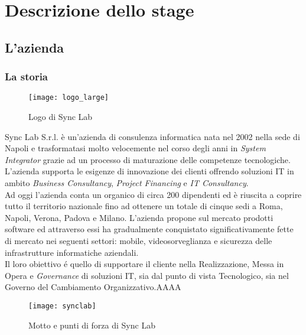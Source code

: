 
\chapter{Descrizione dello stage}
\label{cap:descrizione-stage}



\section{L'azienda}

\subsection{La storia}

\begin{figure}[H]
	\begin{center}
		\texttt{[image: logo\_large]}
		\caption{Logo di Sync Lab}
	\end{center}
\end{figure}

Sync Lab S.r.l. è un'azienda di consulenza informatica nata nel 2002 nella sede di Napoli e trasformatasi molto velocemente nel corso degli anni in \textit{System Integrator} grazie ad un processo di maturazione delle competenze tecnologiche.\\ L'azienda supporta le esigenze di innovazione dei clienti offrendo soluzioni IT in ambito \textit{Business Consultancy}, \textit{Project Financing} e \textit{IT Consultancy}.\\
Ad oggi l'azienda conta un organico di circa 200 dipendenti ed è riuscita a coprire tutto il territorio nazionale fino ad ottenere un totale di cinque sedi a Roma, Napoli, Verona, Padova e Milano. L'azienda propone sul mercato prodotti software ed attraverso essi ha gradualmente conquistato significativamente fette di mercato nei seguenti settori: mobile, videosorveglianza e sicurezza delle infrastrutture informatiche aziendali.\\
Il loro obiettivo é quello di supportare il cliente nella Realizzazione, Messa in Opera e \textit{Governance} di soluzioni IT, sia dal punto di vista Tecnologico, sia nel Governo del Cambiamento Organizzativo.AAAA
\begin{figure}[H]
	\begin{center}
		\texttt{[image: synclab]}
		\caption{Motto e punti di forza di Sync Lab}
	\end{center}
\end{figure}

